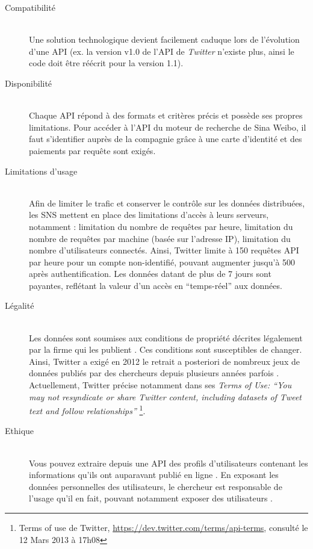 \begin{description}
    
    \item[Compatibilité] 
    \hfill \\
    Une solution technologique devient facilement caduque lors de l{\textquoteright}évolution d{\textquoteright}une API (ex. la version  v1.0 de l'API de \textit{Twitter } n{\textquoteright}existe plus, ainsi le code doit \^etre réécrit pour la version 1.1).  
    
    \item [Disponibilité] 
    \hfill \\
    Chaque API répond à des formats et critères précis et possède ses propres limitations. Pour accéder à l{\textquoteright}API du moteur de recherche de Sina Weibo, il faut s{\textquoteright}identifier auprès de la compagnie gr\^ace à une carte d{\textquoteright}identité et des paiements par requ\^ete sont exigés.

    \item[Limitations d{\textquoteright}usage] 
    \hfill \\
    Afin de limiter le trafic et conserver le contr\^ole sur les données distribuées, les SNS mettent en place des limitations d{\textquoteright}accès à leurs serveurs, notamment : limitation du nombre de requ\^etes par heure, limitation du nombre de requ\^etes par machine (basée sur l{\textquoteright}adresse IP), limitation du nombre d{\textquoteright}utilisateurs connectés. Ainsi, Twitter limite à 150 requ\^etes API par heure pour un compte non-identifié, pouvant augmenter jusqu{\textquoteright}à 500 après authentification. Les données datant de plus de 7 jours sont payantes, reflétant la valeur d{\textquoteright}un accès en {\textquotedblleft}temps-réel{\textquotedblright} aux données.
    
    \item[Légalité]
    \hfill \\
    Les données sont soumises aux conditions de propriété décrites légalement par la firme qui les publient \citep{Clifton2006}. Ces conditions sont susceptibles de changer. Ainsi, Twitter a exigé en 2012 le retrait a posteriori de nombreux jeux de données publiés par des chercheurs depuis plusieurs années parfois \citep{McCreadie2012}. Actuellement, Twitter précise notamment dans ses \textit{Terms of Use: {\textquotedblleft}You may not resyndicate or share Twitter content, including datasets of Tweet text and follow relationships{\textquotedblright} }\footnote{ Terms of use de Twitter, \url{https://dev.twitter.com/terms/api-terms}, consulté le 12 Mars 2013 à 17h08}.
    
    \item[Ethique]
    \hfill \\
    Vous pouvez extraire depuis une API des profils d{\textquoteright}utilisateurs contenant les informations qu{\textquoteright}ils ont auparavant publié en ligne \citep{Felt2008}. En exposant les données personnelles des utilisateurs, le chercheur est responsable de l{\textquoteright}usage qu{\textquoteright}il en fait, pouvant notamment exposer des utilisateurs \citep{Rieder2005}.  
\end{description}

